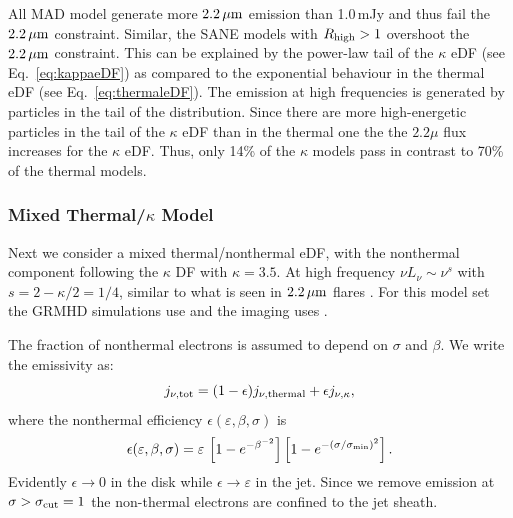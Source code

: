 
All MAD model generate more $2.2\,\mu\mathrm{m}$ emission than 1.0\,mJy and thus fail the $2.2\,\mu\mathrm{m}$ constraint. Similar, the SANE models with $R_{\rm high}>1$ overshoot the $2.2\,\mu\mathrm{m}$ constraint. This can be explained by the power-law tail of the $\kappa$ eDF (see Eq.~\ref{eq:kappaeDF}) as compared to the exponential behaviour in the thermal eDF (see Eq.~\ref{eq:thermaleDF}). The emission at high frequencies is generated by particles in the tail of the distribution. Since there are more high-energetic particles in the tail of the $\kappa$ eDF than in the thermal one the the $2.2\mu$ flux increases for the $\kappa$ eDF. Thus, only 14\% of the $\kappa$ models pass in contrast to 70\% of the thermal models.

\subsubsection{Mixed Thermal/\texorpdfstring{$\kappa$}{kappa} Model}

Next we consider a mixed thermal/nonthermal eDF, with the nonthermal component following the $\kappa$ DF with $\kappa = 3.5$.  At high frequency $\nu L_\nu \sim \nu^s$ with $s = 2 - \kappa/2 = 1/4$, similar to what is seen in $2.2\,\mu\mathrm{m}$ flares \citep{2007ApJ...667..900H}.  For this model set the GRMHD simulations use \bhac and the imaging uses \bhoss.

The fraction of nonthermal electrons is assumed to depend on $\sigma$ and $\beta$.  We write the emissivity as:
\begin{equation}
j_{\nu,\rm{tot}}=(1-\epsilon) j_{\nu,\rm{thermal}} + \epsilon j_{\nu, \kappa},
\label{eq:kappaeff}
\end{equation}
where the nonthermal efficiency $\epsilon( \varepsilon, \beta, \sigma)$ is
\begin{equation}
    \epsilon(\varepsilon,\beta,\sigma)=\varepsilon\,
    \left[1 - e^{-\beta^{-2}}\right]
    \left[1-e^{-(\sigma/\sigma_{\rm min})^2}\right].
    \label{eq:efficiencybetasigma}
\end{equation}
Evidently $\epsilon \rightarrow 0$ in the disk while $\epsilon \rightarrow \varepsilon$ in the jet.  Since we remove emission at $\sigma > \sigma_{\rm cut} = 1$ the non-thermal electrons are confined to the jet sheath.

